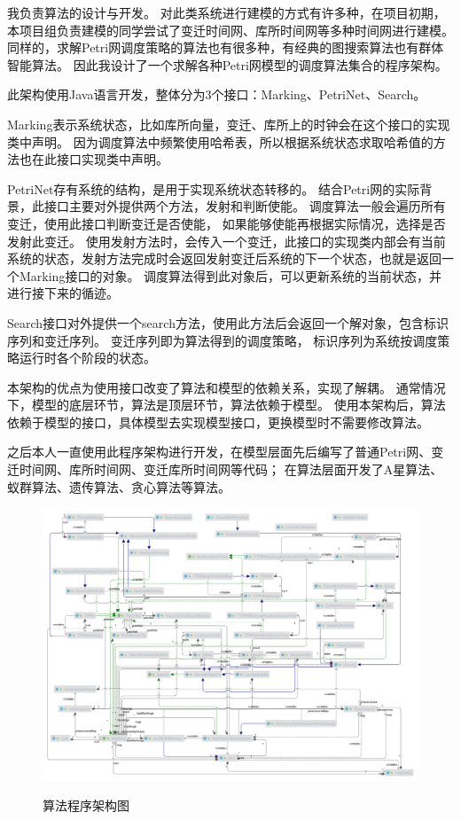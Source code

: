 我负责算法的设计与开发。
对此类系统进行建模的方式有许多种，在项目初期，本项目组负责建模的同学尝试了变迁时间网、库所时间网等多种时间网进行建模。
同样的，求解Petri网调度策略的算法也有很多种，有经典的图搜索算法也有群体智能算法。
因此我设计了一个求解各种Petri网模型的调度算法集合的程序架构。

此架构使用Java语言开发，整体分为3个接口：Marking、PetriNet、Search。

Marking表示系统状态，比如库所向量，变迁、库所上的时钟会在这个接口的实现类中声明。
因为调度算法中频繁使用哈希表，所以根据系统状态求取哈希值的方法也在此接口实现类中声明。

PetriNet存有系统的结构，是用于实现系统状态转移的。
结合Petri网的实际背景，此接口主要对外提供两个方法，发射和判断使能。
调度算法一般会遍历所有变迁，使用此接口判断变迁是否使能，
如果能够使能再根据实际情况，选择是否发射此变迁。
使用发射方法时，会传入一个变迁，此接口的实现类内部会有当前系统的状态，发射方法完成时会返回发射变迁后系统的下一个状态，也就是返回一个Marking接口的对象。
调度算法得到此对象后，可以更新系统的当前状态，并进行接下来的循迹。

Search接口对外提供一个search方法，使用此方法后会返回一个解对象，包含标识序列和变迁序列。
变迁序列即为算法得到的调度策略，
标识序列为系统按调度策略运行时各个阶段的状态。

本架构的优点为使用接口改变了算法和模型的依赖关系，实现了解耦。
通常情况下，模型的底层环节，算法是顶层环节，算法依赖于模型。
使用本架构后，算法依赖于模型的接口，具体模型去实现模型接口，更换模型时不需要修改算法。

之后本人一直使用此程序架构进行开发，在模型层面先后编写了普通Petri网、变迁时间网、库所时间网、变迁库所时间网等代码；
在算法层面开发了A星算法、蚁群算法、遗传算法、贪心算法等算法。

\begin{figure}[H]
	\centering
	\includegraphics[width=\linewidth]{figures/架构图.png}\\
	\caption{算法程序架构图}
\end{figure}

